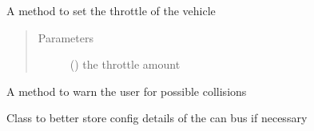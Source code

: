 \documentclass[letterpaper,10pt,english]{sphinxmanual}
\begin{document}
\begin{fulllineitems}
\begin{fulllineitems}
\begin{quote}
\begin{description}
\end{description}\end{quote}

\end{fulllineitems}


\begin{fulllineitems}
\label{\detokenize{driver:lib.driver.Driver.set_throttle}}
A method to set the throttle of the vehicle
\begin{quote}\begin{description}
\item[{Parameters}] \leavevmode
{} () \textendash{} the throttle amount

\end{description}\end{quote}

\end{fulllineitems}


\begin{fulllineitems}
\label{\detokenize{driver:lib.driver.Driver.warn}}
A method to warn the user for possible collisions

\end{fulllineitems}


\end{fulllineitems}


\begin{fulllineitems}
\label{\detokenize{driver:lib.driver.CanConfig}}
Class to better store config details of the can bus if necessary

\end{fulllineitems}
\end{document}
